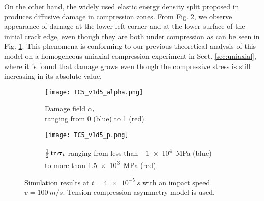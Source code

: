 On the other hand, the widely used elastic energy density split proposed in \cite{MieheHofackerWelschinger:2010} produces diffusive damage in compression zones. From Fig. \ref{fig:v1d5_miehe}, we observe appearance of damage at the lower-left corner and at the lower surface of the initial crack edge, even though they are both under compression as can be seen in Fig. \ref{fig:v1d5_p_miehe}. This phenomena is conforming to our previous theoretical analysis of this model on a homogeneous uniaxial compression experiment in Sect. \ref{sec:uniaxial}, where it is found that damage grows even though the compressive stress is still increasing in its absolute value.
\begin{figure}[htbp]
\centering
\begin{subfigure}[b]{0.48\textwidth}
\centering
\texttt{[image: TC5\_v1d5\_alpha.png]}
\caption{Damage field $\alpha_t$ \\ ranging from 0 (blue) to 1 (red).}
\end{subfigure}
\begin{subfigure}[b]{0.48\textwidth}
\centering
\texttt{[image: TC5\_v1d5\_p.png]}
\caption{$\frac{1}{2}\tr\sig_t$ ranging from less than \SI{-1e4}{MPa} (blue) to more than \SI{1.5e3}{MPa} (red).} \label{fig:v1d5_p_miehe}
\end{subfigure}
\caption{Simulation results at $t=\SI{4e-5}{s}$ with an impact speed $v=\SI{100}{m/s}$. Tension-compression asymmetry model \cite{MieheHofackerWelschinger:2010} is used.} \label{fig:v1d5_miehe}
\end{figure}

